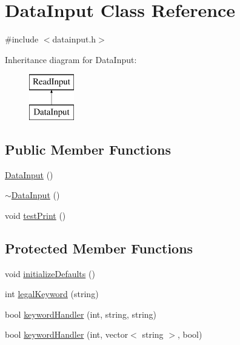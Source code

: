 \hypertarget{class_data_input}{\section{Data\-Input Class Reference}
\label{class_data_input}
}


{\ttfamily \#include $<$datainput.\-h$>$}

Inheritance diagram for Data\-Input\-:\begin{figure}[H]
\begin{center}
\leavevmode
\includegraphics[height=2.000000cm]{class_data_input}
\end{center}
\end{figure}
\subsection*{Public Member Functions}
\begin{DoxyCompactItemize}
\item 
\hyperlink{class_data_input_af2e87fe631ff367c6ef8fa428f3367c4}{Data\-Input} ()
\item 
\hyperlink{class_data_input_a526be3b7b6daeb510ababe0da5222cca}{$\sim$\-Data\-Input} ()
\item 
void \hyperlink{class_data_input_aab1accef9d6147402c2426300656dd3b}{test\-Print} ()
\end{DoxyCompactItemize}
\subsection*{Protected Member Functions}
\begin{DoxyCompactItemize}
\item 
void \hyperlink{class_data_input_a991d4d493aaeaff9d631565b9a49d2ce}{initialize\-Defaults} ()
\item 
int \hyperlink{class_data_input_ae3ca24179103da6e38b99842b9fc1000}{legal\-Keyword} (string)
\item 
bool \hyperlink{class_data_input_a80075c8e86436e00c89d891ce0be57a8}{keyword\-Handler} (int, string, string)
\item 
bool \hyperlink{class_data_input_a70d0380171a30a659a6c7868f2573c92}{keyword\-Handler} (int, vector$<$ string $>$, bool)
\end{DoxyCompactItemize}


